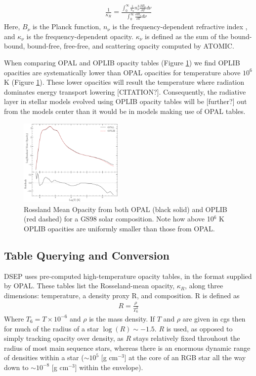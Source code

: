 \begin{align}\label{eqn:RMOATOMIC}
	\frac{1}{\kappa_{R}} =
		\frac{\int_{0}^{\infty}\frac{1}{\kappa_{\nu}}n_{\nu}^{3}\frac{\partial
		B_{\nu}}{\partial T}d\nu}{\int_{0}^{\infty}\frac{\partial B_{\nu}}{\partial
		T}d\nu}
\end{align}
Here, $B_{\nu}$ is the Planck function, $n_{\nu}$ is the frequency-dependent
refractive index \citep{Armstrong2014}, and $\kappa_{\nu}$ is the
frequency-dependent opacity. $\kappa_{\nu}$ is defined as the sum of the
bound-bound, bound-free, free-free, and scattering opacity computed by ATOMIC.

When comparing OPAL and OPLIB opacity tables (Figure \ref{fig:opacComp}) we
find OPLIB opacities are systematically lower than OPAL opacities for
temperature above $10^{6}$ K (Figure \ref{fig:opacComp}). These lower opacities
will result the temperature where radiation dominates energy transport lowering
{\color{red} [CITATION?]}. Consequently, the radiative layer in stellar models
evolved using OPLIB opacity tables will be {\color{red} [further?]} out from
the models center than it would be in models making use of OPAL tables.

\begin{figure}
	\centering
	\includegraphics[width=0.45\textwidth]{src/figures/OpacityComparision.pdf}
	\caption{Rossland Mean Opacity from both OPAL (black solid) and OPLIB (red
	dashed) for a GS98 solar composition. Note how above 10$^{6}$ K OPLIB
	opacities are uniformly smaller than those from OPAL.}
	\label{fig:opacComp}
\end{figure}

\subsection{Table Querying and Conversion}
DSEP uses pre-computed high-temperature opacity tables, in the format supplied
by OPAL. These tables list the Rosseland-mean opacity, $\kappa_{R}$, along
three dimensions: temperature, a density proxy R, and composition. R is defined
as
\begin{align} \label{eqn:Req}
	R = \frac{\rho}{T_{6}^{3}}
\end{align}
Where $T_{6} = T\times10^{-6}$ and $\rho$ is the mass density. If $T$ and
$\rho$ are given in cgs then for much of the radius of a star
$\log(R)\sim-1.5$.  $R$ is used, as opposed to simply tracking opacity over
density, as $R$ stays relatively fixed throuhout the radius of most main
sequence stars, whereas there is an enormous dynamic range of densities within
a star ($\sim 10^{5}$ [g cm$^{-3}$] at the core of an RGB star all the way down
to $\sim 10^{-8}$ [g cm$^{-3}$] within the envelope). 


